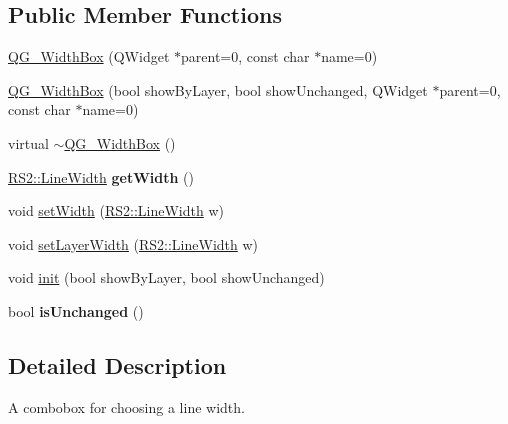 \subsection*{Public Member Functions}
\begin{DoxyCompactItemize}
\item 
\hyperlink{classQG__WidthBox_a7fa032d550049b6757688a2cbb51443b}{Q\-G\-\_\-\-Width\-Box} (Q\-Widget $\ast$parent=0, const char $\ast$name=0)
\item 
\hyperlink{classQG__WidthBox_a339092e1c23aeebe5281b9e7b29659d8}{Q\-G\-\_\-\-Width\-Box} (bool show\-By\-Layer, bool show\-Unchanged, Q\-Widget $\ast$parent=0, const char $\ast$name=0)
\item 
virtual \hyperlink{classQG__WidthBox_a3bce0e93c6e7faa388a2541bc52514d1}{$\sim$\-Q\-G\-\_\-\-Width\-Box} ()
\item 
\hypertarget{classQG__WidthBox_ac96e5bf7e7456916fa2beae81fe36908}{\hyperlink{classRS2_a023485c482c5ee9e36b3dfad781adf29}{R\-S2\-::\-Line\-Width} {\bfseries get\-Width} ()}\label{classQG__WidthBox_ac96e5bf7e7456916fa2beae81fe36908}

\item 
void \hyperlink{classQG__WidthBox_ace55184b4f8fa19513fe5d91a1c13a4d}{set\-Width} (\hyperlink{classRS2_a023485c482c5ee9e36b3dfad781adf29}{R\-S2\-::\-Line\-Width} w)
\item 
void \hyperlink{classQG__WidthBox_a6b9e282f967ccbabc2327d5d3a4595bf}{set\-Layer\-Width} (\hyperlink{classRS2_a023485c482c5ee9e36b3dfad781adf29}{R\-S2\-::\-Line\-Width} w)
\item 
void \hyperlink{classQG__WidthBox_a65effd0de93690e50640bd25909130c1}{init} (bool show\-By\-Layer, bool show\-Unchanged)
\item 
\hypertarget{classQG__WidthBox_a352e6171213983635d69f88a068d222d}{bool {\bfseries is\-Unchanged} ()}\label{classQG__WidthBox_a352e6171213983635d69f88a068d222d}

\end{DoxyCompactItemize}


\subsection{Detailed Description}
A combobox for choosing a line width. 

